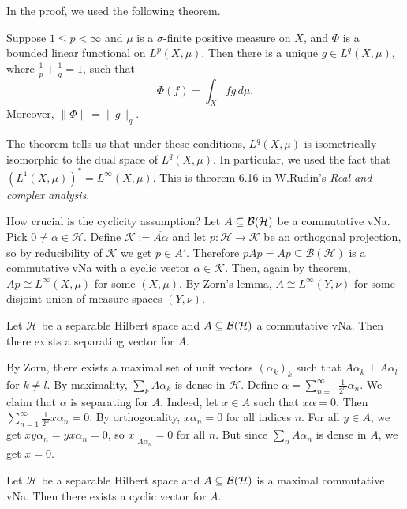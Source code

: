 In the proof, we used the following theorem.

\begin{theorem}
  Suppose $1 \leq p < \infty$ and $\mu$ is a $\sigma$-finite positive measure on $X$,
  and $\Phi$ is a bounded linear functional on $L^p(X, \mu)$.
  Then there is a unique $g \in L^q (X, \mu)$, where $\frac{1}{p} + \frac{1}{q} = 1$, such that 
  $$\Phi (f) = \int_X fg\, d\mu.$$ Moreover, $\| \Phi\| = \|g\|_{q}$.
\end{theorem}

The theorem tells us that under these conditions, $L^q (X, \mu)$ is isometrically isomorphic to the dual space of $L^{q} (X, \mu)$.
In particular, we used the fact that $(L^1 (X, \mu))^* = L^\infty (X, \mu)$. This is theorem 6.16 in W.Rudin's \emph{Real and complex analysis}.


How crucial is the cyclicity assumption?
Let $A \subseteq \operatorname{\mathcal{B} (\mathcal{H})}$  be a commutative vNa. Pick $0 \neq \alpha \in \mathcal{H}$.
Define $\mathcal{K}:= \overline{A\alpha}$ and let $p: \mathcal{H} \to \mathcal{K}$ be an orthogonal 
projection, so by reducibility of $\mathcal{K}$ we get $p \in A'$. Therefore $pAp = Ap \subseteq \mathcal{B}(\mathcal{H})$
is a commutative vNa with a cyclic vector $\alpha \in \mathcal{K}$.
Then, again by theorem, $Ap \cong L^\infty (X, \mu)$ for some $(X, \mu)$.
By Zorn's lemma, $A \cong L^\infty (Y, \nu)$ for some disjoint union of measure spaces $(Y, \nu)$.


\begin{proposition}
  Let $\mathcal{H}$ be a separable Hilbert space and $A \subseteq \operatorname{\mathcal{B} (\mathcal{H})}$
  a commutative vNa. Then there exists a separating vector for $A$.
\end{proposition}

\begin{myproof}
  By Zorn, there exists a maximal set of unit vectors $(\alpha_k)_k$ such that $A \alpha_k \perp A \alpha_l$
  for $k \neq l$. By maximality, $\sum_k A \alpha_k$ is dense in $\mathcal{H}$.
  Define $\alpha = \sum_{n = 1} ^\infty \frac{1}{2^n} \alpha_n$. We claim that $\alpha$ is separating for $A$.
  Indeed, let $x \in A$ such that $x \alpha = 0$. Then $\sum_{n = 1} ^\infty \frac{1}{2^n} x \alpha_n = 0$.
  By orthogonality, $x\alpha_n = 0$ for all indices $n$. For all $y \in A$, we get 
  $xy \alpha_n = y x \alpha_n = 0$, so $x\big|_{A\alpha_n} = 0$ for all $n$. But since $\sum_n A \alpha_n$ is dense in $A$, we get $x = 0$.
\end{myproof}

\begin{corollary}
  Let $\mathcal{H}$ be a separable Hilbert space and $A \subseteq \operatorname{\mathcal{B} (\mathcal{H})}$
  is a maximal commutative vNa. Then there exists a cyclic vector for $A$.
\end{corollary}

